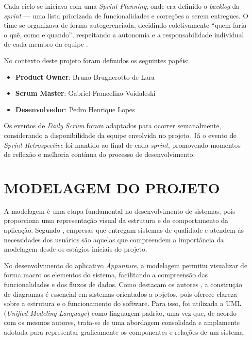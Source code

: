 Cada ciclo se iniciava com uma \textit{Sprint Planning}, onde era definido o \textit{backlog} da \textit{sprint} --- uma lista priorizada de funcionalidades e correções a serem entregues. O time se organizava de forma autogerenciada, decidindo coletivamente ``quem faria o quê, como e quando'', respeitando a autonomia e a responsabilidade individual de cada membro da equipe \cite{schwaber2020}.

No contexto deste projeto foram definidos os seguintes papéis:

\begin{itemize}
    \item \textbf{Product Owner}: Bruno Brugnerotto de Lara
    \item \textbf{Scrum Master}: Gabriel Francelino Voidaleski
    \item \textbf{Desenvolvedor}: Pedro Henrique Lopes
\end{itemize}

Os eventos de \textit{Daily Scrum} foram adaptados para ocorrer semanalmente, considerando a disponibilidade da equipe envolvida no projeto. Já o evento de \textit{Sprint Retrospective} foi mantido ao final de cada \textit{sprint}, promovendo momentos de reflexão e melhoria contínua do processo de desenvolvimento.

\section{MODELAGEM DO PROJETO} \label{sec:modelagem}

A modelagem é uma etapa fundamental no desenvolvimento de sistemas, pois proporciona uma representação visual da estrutura e do comportamento da aplicação. Segundo , empresas que entregam sistemas de qualidade e atendem às necessidades dos usuários são aquelas que compreendem a importância da modelagem desde os estágios iniciais do projeto.

No desenvolvimento do aplicativo \textit{Appunture}, a modelagem permitiu visualizar de forma macro os elementos do sistema, facilitando a compreensão das funcionalidades e dos fluxos de dados. Como destacam os autores , a construção de diagramas é essencial em sistemas orientados a objetos, pois oferece clareza sobre a estrutura e o funcionamento do software. Para isso, foi utilizada a UML (\textit{Unified Modeling Language}) como linguagem padrão, uma vez que, de acordo com os mesmos autores, trata-se de uma abordagem consolidada e amplamente adotada para representar graficamente os componentes e relações de um sistema.

